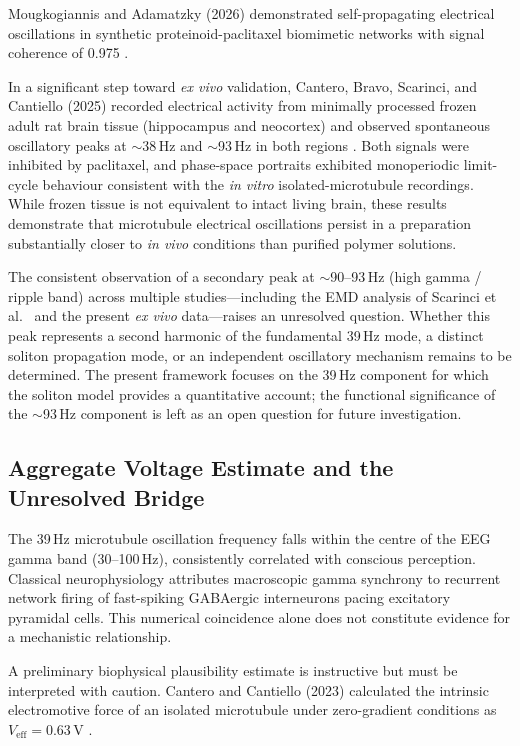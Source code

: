 \documentclass[10pt, a4paper, twocolumn]{article}
\begin{document}
Mougkogiannis and Adamatzky (2026) demonstrated self-propagating
electrical oscillations in synthetic proteinoid-paclitaxel biomimetic
networks with signal coherence of 0.975 \cite{mougkogiannis2026}.

In a significant step toward \emph{ex vivo} validation, Cantero,
Bravo, Scarinci, and Cantiello (2025) recorded electrical
activity from minimally processed frozen adult rat brain tissue
(hippocampus and neocortex) and observed spontaneous oscillatory
peaks at $\sim$38\,Hz and $\sim$93\,Hz in both regions
\cite{cantero2025exvivo}. Both signals were inhibited by
paclitaxel, and phase-space portraits exhibited monoperiodic
limit-cycle behaviour consistent with the \emph{in vitro}
isolated-microtubule recordings. While frozen tissue is not
equivalent to intact living brain, these results demonstrate
that microtubule electrical oscillations persist in a preparation
substantially closer to \emph{in vivo} conditions than purified
polymer solutions.

The consistent observation of a secondary peak at
$\sim$90--93\,Hz (high gamma / ripple band) across multiple
studies---including the EMD analysis of Scarinci et al.\
\cite{scarinci2023} and the present \emph{ex vivo}
data---raises an unresolved question. Whether this peak
represents a second harmonic of the fundamental 39\,Hz mode,
a distinct soliton propagation mode, or an independent
oscillatory mechanism remains to be determined. The present
framework focuses on the 39\,Hz component for which the
soliton model provides a quantitative account; the functional
significance of the $\sim$93\,Hz component is left as an
open question for future investigation.

\subsection{Aggregate Voltage Estimate and the Unresolved Bridge}
\label{sec:voltage_bridge}

The 39\,Hz microtubule oscillation frequency falls within the centre of
the EEG gamma band (30--100\,Hz), consistently correlated with conscious
perception. Classical neurophysiology attributes macroscopic gamma
synchrony to recurrent network firing of fast-spiking GABAergic
interneurons pacing excitatory pyramidal cells. This numerical
coincidence alone does not constitute evidence for a mechanistic
relationship.

A preliminary biophysical plausibility estimate is instructive
but must be interpreted with caution. Cantero and Cantiello
(2023) calculated the intrinsic electromotive force of an
isolated microtubule under zero-gradient conditions as
$V_{\text{eff}} = 0.63$\,\textmu V \cite{cantero2023}.
\end{document}
